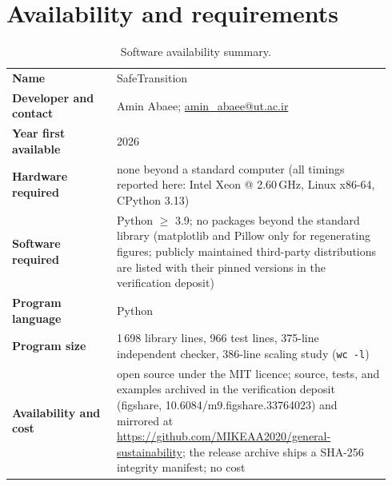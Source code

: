 \documentclass[11pt]{article}
\begin{document}
\section{Availability and requirements}\label{sec:availability}

\begin{table}[h]
\centering
\small
\begin{tabular}{@{}p{0.26\linewidth}p{0.68\linewidth}@{}}
\toprule
\textbf{Name} & SafeTransition \\
\textbf{Developer and contact} & Amin Abaee;
\href{mailto:amin_abaee@ut.ac.ir}{amin\_abaee@ut.ac.ir} \\
\textbf{Year first available} & 2026 \\
\textbf{Hardware required} & none beyond a standard computer (all timings
reported here: Intel Xeon @ 2.60\,GHz, Linux x86-64, CPython 3.13) \\
\textbf{Software required} & Python $\geq$ 3.9; no packages beyond the
standard library (matplotlib and Pillow only for regenerating figures;
publicly maintained third-party distributions are listed with their pinned
versions in the verification deposit) \\
\textbf{Program language} & Python \\
\textbf{Program size} & 1\,698 library lines, 966 test lines, 375-line
independent checker, 386-line scaling study (\texttt{wc~-l}) \\
\textbf{Availability and cost} & open source under the MIT licence; source,
tests, and examples archived in the verification deposit
\citep{Deposit2026} (figshare, 10.6084/m9.figshare.33764023) and mirrored
at \url{https://github.com/MIKEAA2020/general-sustainability}; the
release archive ships a SHA-256 integrity manifest; no cost \\
\bottomrule
\end{tabular}
\caption{Software availability summary.}
\label{tab:availability}
\end{table}
\end{document}
